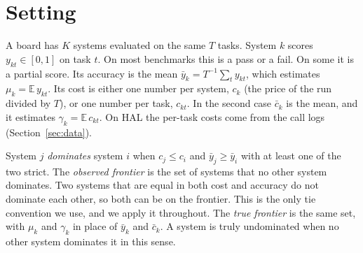 \documentclass[11pt]{article}
\newcommand{\E}{\mathbb{E}}
\begin{document}
\section{Setting}
\label{sec:setting}

A board has $K$ systems evaluated on the same $T$ tasks. System $k$ scores $y_{kt}\in[0,1]$ on task $t$. On most benchmarks this is a pass or a fail. On some it is a partial score. Its accuracy is the mean $\bar y_k=T^{-1}\sum_t y_{kt}$, which estimates $\mu_k=\E\,y_{kt}$. Its cost is either one number per system, $c_k$ (the price of the run divided by $T$), or one number per task, $c_{kt}$. In the second case $\bar c_k$ is the mean, and it estimates $\gamma_k=\E\,c_{kt}$. On HAL the per-task costs come from the call logs (Section~\ref{sec:data}).

System $j$ \emph{dominates} system $i$ when $c_j\le c_i$ and $\bar y_j\ge\bar y_i$ with at least one of the two strict. The \emph{observed frontier} is the set of systems that no other system dominates. Two systems that are equal in both cost and accuracy do not dominate each other, so both can be on the frontier. This is the only tie convention we use, and we apply it throughout. The \emph{true frontier} is the same set, with $\mu_k$ and $\gamma_k$ in place of $\bar y_k$ and $\bar c_k$. A system is truly undominated when no other system dominates it in this sense.
\end{document}
